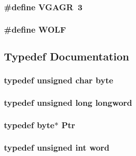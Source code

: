 \label{ID__HEAD_8H_ab90640f67729ad8aaf1259890da41991}
\hypertarget{ID__HEAD_8H_ac68ed8fd8f6e4946ede4e0f72d3d0d38}{
\subsubsection[{VGAGR}]{\setlength{\rightskip}{0pt plus 5cm}\#define VGAGR~3}}
\label{ID__HEAD_8H_ac68ed8fd8f6e4946ede4e0f72d3d0d38}
\hypertarget{ID__HEAD_8H_a94127cc7d8cfd3ad02d2369ddd49f839}{
\subsubsection[{WOLF}]{\setlength{\rightskip}{0pt plus 5cm}\#define WOLF}}
\label{ID__HEAD_8H_a94127cc7d8cfd3ad02d2369ddd49f839}


\subsection{Typedef Documentation}
\hypertarget{ID__HEAD_8H_a0c8186d9b9b7880309c27230bbb5e69d}{
\subsubsection[{byte}]{\setlength{\rightskip}{0pt plus 5cm}typedef unsigned char {\bf byte}}}
\label{ID__HEAD_8H_a0c8186d9b9b7880309c27230bbb5e69d}
\hypertarget{ID__HEAD_8H_a8a9a7dd50c6fdb45dcdf0eb929479663}{
\subsubsection[{longword}]{\setlength{\rightskip}{0pt plus 5cm}typedef unsigned long {\bf longword}}}
\label{ID__HEAD_8H_a8a9a7dd50c6fdb45dcdf0eb929479663}
\hypertarget{ID__HEAD_8H_a12c6a4af9f1e5c1a48e22de17a94ed1b}{
\subsubsection[{Ptr}]{\setlength{\rightskip}{0pt plus 5cm}typedef {\bf byte}$\ast$ {\bf Ptr}}}
\label{ID__HEAD_8H_a12c6a4af9f1e5c1a48e22de17a94ed1b}
\hypertarget{ID__HEAD_8H_abad51e07ab6d26bec9f1f786c8d65bcd}{
\subsubsection[{word}]{\setlength{\rightskip}{0pt plus 5cm}typedef unsigned int {\bf word}}}
\label{ID__HEAD_8H_abad51e07ab6d26bec9f1f786c8d65bcd}


